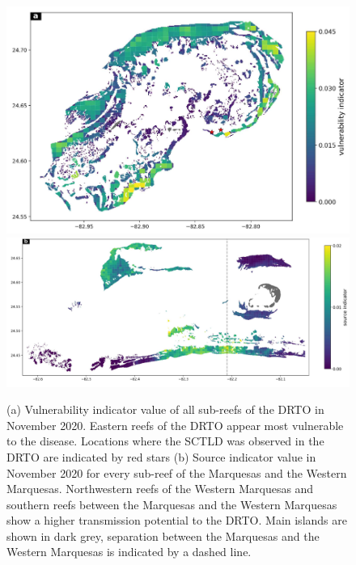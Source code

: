 \begin{figure}
    \centering
    \includegraphics[width=.6\textwidth]{chapters/drto/figures/vulnerability_new.png}
    \includegraphics[width=.9\textwidth]{chapters/drto/figures/source_new.png}
    \caption{ (a) Vulnerability indicator value of all sub-reefs of the DRTO in November 2020. Eastern reefs of the DRTO appear most vulnerable to the disease. Locations where the SCTLD was observed in the DRTO are indicated by red stars (b) Source indicator value in November 2020 for every sub-reef of the Marquesas and the Western Marquesas. Northwestern reefs of the Western Marquesas and southern reefs between the Marquesas and the Western Marquesas show a higher transmission potential to the DRTO. Main islands are shown in dark grey, separation between the Marquesas and the Western Marquesas is indicated by a dashed line.}
    \label{fig:fig4_drto}
\end{figure}



